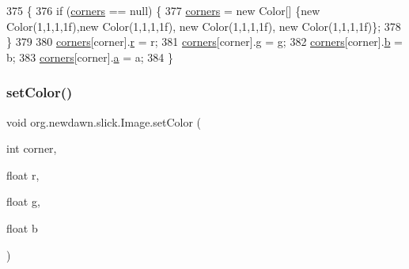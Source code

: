\begin{DoxyCode}
375                                                                          \{
376         \textcolor{keywordflow}{if} (\mbox{\hyperlink{classorg_1_1newdawn_1_1slick_1_1_image_a3b6e6a11b3d871cf5677a561b19d9131}{corners}} == null) \{
377             \mbox{\hyperlink{classorg_1_1newdawn_1_1slick_1_1_image_a3b6e6a11b3d871cf5677a561b19d9131}{corners}} = \textcolor{keyword}{new} Color[] \{\textcolor{keyword}{new} Color(1,1,1,1f),\textcolor{keyword}{new} Color(1,1,1,1f), \textcolor{keyword}{new} Color(1,1,1,1f), \textcolor{keyword}{new}
       Color(1,1,1,1f)\};
378         \}
379         
380         \mbox{\hyperlink{classorg_1_1newdawn_1_1slick_1_1_image_a3b6e6a11b3d871cf5677a561b19d9131}{corners}}[corner].\mbox{\hyperlink{classorg_1_1newdawn_1_1slick_1_1_color_ac07fa95108064b044dcf9a53e95dcb48}{r}} = r;
381         \mbox{\hyperlink{classorg_1_1newdawn_1_1slick_1_1_image_a3b6e6a11b3d871cf5677a561b19d9131}{corners}}[corner].\mbox{\hyperlink{classorg_1_1newdawn_1_1slick_1_1_color_aa6ebff7c102a1476e7b511a78397b753}{g}} = g;
382         \mbox{\hyperlink{classorg_1_1newdawn_1_1slick_1_1_image_a3b6e6a11b3d871cf5677a561b19d9131}{corners}}[corner].\mbox{\hyperlink{classorg_1_1newdawn_1_1slick_1_1_color_a8c0cef152e16438fee852a97e50ef7a5}{b}} = b;
383         \mbox{\hyperlink{classorg_1_1newdawn_1_1slick_1_1_image_a3b6e6a11b3d871cf5677a561b19d9131}{corners}}[corner].\mbox{\hyperlink{classorg_1_1newdawn_1_1slick_1_1_color_ab9288c822ff7614a77c887eb8c2595a7}{a}} = a;
384     \}
\end{DoxyCode}
\mbox{\label{classorg_1_1newdawn_1_1slick_1_1_image_acaf13b37e17ee30f89aadf780d794efd}} 
\subsubsection{\texorpdfstring{set\+Color()}{setColor()}\hspace{0.1cm}{\footnotesize\ttfamily [2/2]}}
{\footnotesize\ttfamily void org.\+newdawn.\+slick.\+Image.\+set\+Color (\begin{DoxyParamCaption}\item[{int}]{corner,  }\item[{float}]{r,  }\item[{float}]{g,  }\item[{float}]{b }\end{DoxyParamCaption})\hspace{0.3cm}{\ttfamily [inline]}}

